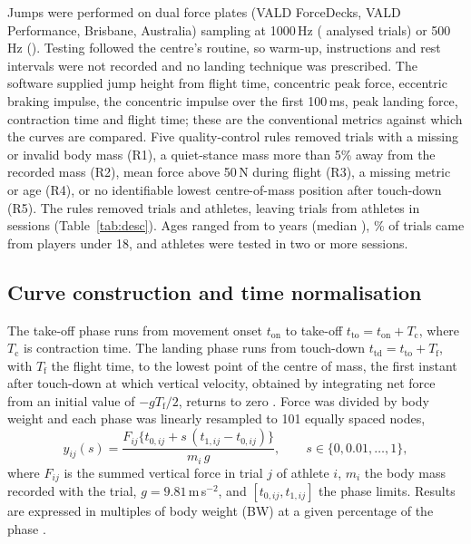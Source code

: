 Jumps were performed on dual force plates (VALD ForceDecks, VALD Performance, Brisbane, Australia) sampling at 1000\,Hz (\nFsHigh{} analysed trials) or 500\,Hz (\nFsLow). Testing followed the centre's routine, so warm-up, instructions and rest intervals were not recorded and no landing technique was prescribed. The software supplied jump height from flight time, concentric peak force, eccentric braking impulse, the concentric impulse over the first 100\,ms, peak landing force, contraction time and flight time; these are the conventional metrics against which the curves are compared. Five quality-control rules removed trials with a missing or invalid body mass (R1), a quiet-stance mass more than 5\% away from the recorded mass (R2), mean force above 50\,N during flight (R3), a missing metric or age (R4), or no identifiable lowest centre-of-mass position after touch-down (R5). The rules removed \nDropped{} trials and \nAthLost{} athletes, leaving \nTrials{} trials from \nAth{} athletes in \nSess{} sessions (Table~\ref{tab:desc}). Ages ranged from \ageMin{} to \ageMax{} years (median \ageMedian), \pctUnderEighteen\% of trials came from players under 18, and \nAthMulti{} athletes were tested in two or more sessions.



\subsection{Curve construction and time normalisation}

The take-off phase runs from movement onset $t_{\mathrm{on}}$ to take-off $t_{\mathrm{to}} = t_{\mathrm{on}} + T_{\mathrm{c}}$, where $T_{\mathrm{c}}$ is contraction time. The landing phase runs from touch-down $t_{\mathrm{td}} = t_{\mathrm{to}} + T_{\mathrm{f}}$, with $T_{\mathrm{f}}$ the flight time, to the lowest point of the centre of mass, the first instant after touch-down at which vertical velocity, obtained by integrating net force from an initial value of $-g T_{\mathrm{f}}/2$, returns to zero \parencite{linthorne2001,street2001,mcmahon2018}. Force was divided by body weight and each phase was linearly resampled to 101 equally spaced nodes,
\begin{equation}
y_{ij}(s) = \frac{F_{ij}\{t_{0,ij} + s\,(t_{1,ij} - t_{0,ij})\}}{m_i\,g}, \qquad s \in \{0, 0.01, \ldots, 1\},
\label{eq:norm}
\end{equation}
where $F_{ij}$ is the summed vertical force in trial $j$ of athlete $i$, $m_i$ the body mass recorded with the trial, $g = 9.81$\,m\,s$^{-2}$, and $[t_{0,ij}, t_{1,ij}]$ the phase limits. Results are expressed in multiples of body weight (BW) at a given percentage of the phase \parencite{richter2014,warmenhoven2019}.

